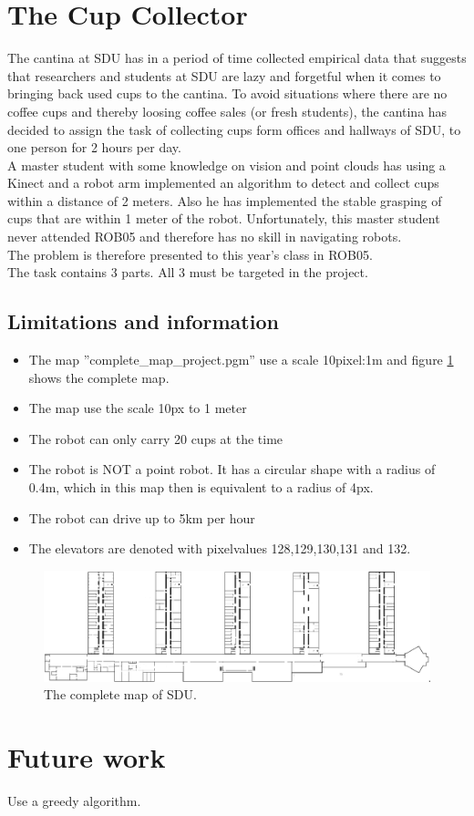 \documentclass[11pt,a4paper]{article}
\begin{document}
\section{The Cup Collector}
The cantina at SDU has in a period of time collected empirical data that suggests that researchers and students at SDU are lazy and forgetful when it comes to bringing back used cups to the cantina. To avoid situations where there are no coffee cups and thereby loosing coffee sales (or fresh students), the cantina has decided to assign the task of collecting cups form offices and hallways of SDU, to one person for 2 hours per day.\\[0.2cm]
A master student with some knowledge on vision and point clouds has using a Kinect and a robot arm implemented an algorithm to detect and collect cups within a distance of 2 meters. Also he has implemented the stable grasping of cups that are within 1 meter of the robot. Unfortunately, this master student never attended ROB05 and therefore has no skill in navigating robots.\\[0.2cm]
The problem is therefore presented to this year’s class in ROB05.\\[0.2cm]
The task contains 3 parts. All 3 must be targeted in the project.

\subsection{Limitations and information}
\begin{itemize}
\item The map ”complete\_map\_project.pgm” use a scale 10pixel:1m and figure \ref{fig::original} shows the complete map. 
\item The map use the scale 10px to 1 meter
\item The robot can only carry 20 cups at the time
\item The robot is NOT a point robot. It has a circular shape with a radius of 0.4m, which in this map then is equivalent to a radius of 4px. 
\item The robot can drive up to 5km per hour
\item The elevators are denoted with pixelvalues 128,129,130,131 and 132.
\end{itemize}

\begin{figure}[H]
\centering
\includegraphics[scale=0.33]{img/original.png}
\caption{The complete map of SDU.}
\label{fig::original}
\end{figure}

\newpage


\newpage


\newpage


\newpage

\section{Future work}
Use a greedy algorithm. 
\end{document}
